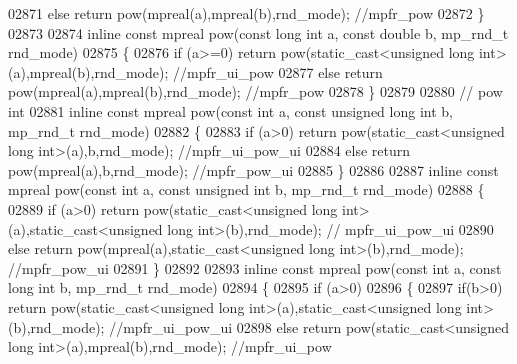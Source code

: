 \begin{DoxyCode}
{{02871     \textcolor{keywordflow}{else}        \textcolor{keywordflow}{return} pow(mpreal(a),mpreal(b),rnd\_mode); \textcolor{comment}{//mpfr\_pow}
02872 \}
02873 
02874 \textcolor{keyword}{inline} \textcolor{keyword}{const} mpreal pow(\textcolor{keyword}{const} \textcolor{keywordtype}{long} \textcolor{keywordtype}{int} a, \textcolor{keyword}{const} \textcolor{keywordtype}{double} b, mp\_rnd\_t rnd\_mode)
02875 \{
02876     \textcolor{keywordflow}{if} (a>=0)   \textcolor{keywordflow}{return} pow(static\_cast<unsigned long int>(a),mpreal(b),rnd\_mode); \textcolor{comment}{//mpfr\_ui\_pow}
02877     \textcolor{keywordflow}{else}        \textcolor{keywordflow}{return} pow(mpreal(a),mpreal(b),rnd\_mode); \textcolor{comment}{//mpfr\_pow}
02878 \}
02879 
02880 \textcolor{comment}{// pow int}
02881 \textcolor{keyword}{inline} \textcolor{keyword}{const} mpreal pow(\textcolor{keyword}{const} \textcolor{keywordtype}{int} a, \textcolor{keyword}{const} \textcolor{keywordtype}{unsigned} \textcolor{keywordtype}{long} \textcolor{keywordtype}{int} b, mp\_rnd\_t rnd\_mode)
02882 \{
02883     \textcolor{keywordflow}{if} (a>0) \textcolor{keywordflow}{return} pow(static\_cast<unsigned long int>(a),b,rnd\_mode); \textcolor{comment}{//mpfr\_ui\_pow\_ui}
02884     \textcolor{keywordflow}{else}     \textcolor{keywordflow}{return} pow(mpreal(a),b,rnd\_mode); \textcolor{comment}{//mpfr\_pow\_ui}
02885 \}
02886 
02887 \textcolor{keyword}{inline} \textcolor{keyword}{const} mpreal pow(\textcolor{keyword}{const} \textcolor{keywordtype}{int} a, \textcolor{keyword}{const} \textcolor{keywordtype}{unsigned} \textcolor{keywordtype}{int} b, mp\_rnd\_t rnd\_mode)
02888 \{
02889     \textcolor{keywordflow}{if} (a>0) \textcolor{keywordflow}{return} pow(static\_cast<unsigned long int>(a),static\_cast<unsigned long int>(b),rnd\_mode);  \textcolor{comment}{//
      mpfr\_ui\_pow\_ui}
02890     \textcolor{keywordflow}{else}     \textcolor{keywordflow}{return} pow(mpreal(a),static\_cast<unsigned long int>(b),rnd\_mode); \textcolor{comment}{//mpfr\_pow\_ui}
02891 \}
02892 
02893 \textcolor{keyword}{inline} \textcolor{keyword}{const} mpreal pow(\textcolor{keyword}{const} \textcolor{keywordtype}{int} a, \textcolor{keyword}{const} \textcolor{keywordtype}{long} \textcolor{keywordtype}{int} b, mp\_rnd\_t rnd\_mode)
02894 \{
02895     \textcolor{keywordflow}{if} (a>0)
02896     \{
02897         \textcolor{keywordflow}{if}(b>0) \textcolor{keywordflow}{return} pow(static\_cast<unsigned long int>(a),static\_cast<unsigned long int>(b),rnd\_mode); \textcolor{comment}{
      //mpfr\_ui\_pow\_ui}
02898         \textcolor{keywordflow}{else}    \textcolor{keywordflow}{return} pow(static\_cast<unsigned long int>(a),mpreal(b),rnd\_mode); \textcolor{comment}{//mpfr\_ui\_pow}
}}
\end{DoxyCode}
